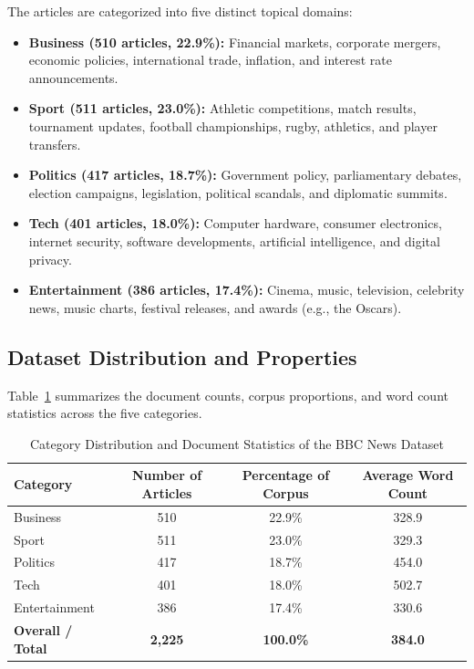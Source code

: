\documentclass[11pt,a4paper]{article}
\begin{document}
The articles are categorized into five distinct topical domains:
\begin{itemize}[leftmargin=1.5em]
    \item \textbf{Business (510 articles, 22.9\%):} Financial markets, corporate mergers, economic policies, international trade, inflation, and interest rate announcements.
    \item \textbf{Sport (511 articles, 23.0\%):} Athletic competitions, match results, tournament updates, football championships, rugby, athletics, and player transfers.
    \item \textbf{Politics (417 articles, 18.7\%):} Government policy, parliamentary debates, election campaigns, legislation, political scandals, and diplomatic summits.
    \item \textbf{Tech (401 articles, 18.0\%):} Computer hardware, consumer electronics, internet security, software developments, artificial intelligence, and digital privacy.
    \item \textbf{Entertainment (386 articles, 17.4\%):} Cinema, music, television, celebrity news, music charts, festival releases, and awards (e.g., the Oscars).
\end{itemize}

\subsection{Dataset Distribution and Properties}
Table~\ref{tab:dataset_stats} summarizes the document counts, corpus proportions, and word count statistics across the five categories.

\begin{table}[H]
\centering
\renewcommand{\arraystretch}{1.25}
\begin{tabular}{|l|c|c|c|}
\hline
\textbf{Category} & \textbf{Number of Articles} & \textbf{Percentage of Corpus} & \textbf{Average Word Count} \\ \hline
Business & 510 & 22.9\% & 328.9 \\ \hline
Sport & 511 & 23.0\% & 329.3 \\ \hline
Politics & 417 & 18.7\% & 454.0 \\ \hline
Tech & 401 & 18.0\% & 502.7 \\ \hline
Entertainment & 386 & 17.4\% & 330.6 \\ \hline
\textbf{Overall / Total} & \textbf{2,225} & \textbf{100.0\%} & \textbf{384.0} \\ \hline
\end{tabular}
\caption{Category Distribution and Document Statistics of the BBC News Dataset}
\label{tab:dataset_stats}
\end{table}
\end{document}
